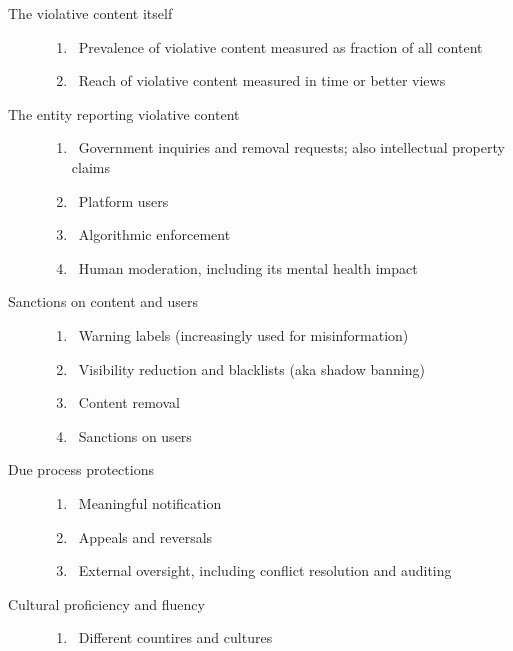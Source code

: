 
\begin{description}
\item[The violative content itself]\hfill
    \begin{enumerate}
        \item {}~Prevalence of violative content measured as fraction
            of all content
        \item {}~Reach of violative content measured in time
            or better views
    \end{enumerate}
\item[The entity reporting violative content]\hfill
    \begin{enumerate}[resume]
        \item {}~Government inquiries and removal
            requests; also intellectual property claims
        \item {}~Platform users
        \item {}~Algorithmic enforcement
        \item {}~Human moderation, including its mental health impact
    \end{enumerate}
\item[Sanctions on content and users]\hfill
    \begin{enumerate}[resume]
        \item {}~Warning labels (increasingly used for misinformation)
        \item {}~Visibility reduction and blacklists (aka shadow
            banning)
        \item {}~Content removal
        \item {}~Sanctions on users
    \end{enumerate}
\item[Due process protections]\hfill
    \begin{enumerate}[resume]
        \item {}~Meaningful notification
        \item {}~Appeals and reversals
        \item {}~External oversight, including conflict resolution and auditing
    \end{enumerate}
\item[Cultural proficiency and fluency]\hfill
    \begin{enumerate}[resume]
        \item {}~Different countires and cultures
    \end{enumerate}
\end{description}

